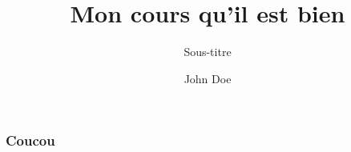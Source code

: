 \documentclass{beamer}
\begin{document}
\title[Petit titre]{Mon cours qu'il est bien}
\subtitle{Sous-titre}
\author{John Doe}
\subject{Slides to present my beamer class for ISAE slides.}
\date{}

\begin{frame}
  \titlepage
\end{frame}


\begin{frame}
\frametitle{Coucou}



\end{frame}
\end{document}
